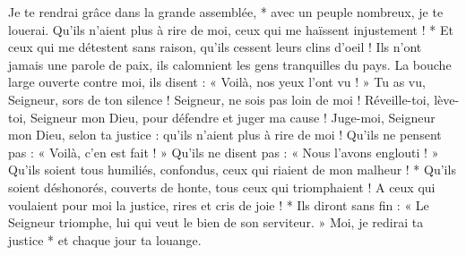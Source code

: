 Je te rendrai grâce dans la grande assemblée, * avec un peuple nombreux, je te louerai.
\versseparator
Qu'ils n'aient plus à rire de moi, ceux qui me haïssent injustement ! * Et ceux qui me détestent sans raison, qu'ils cessent leurs clins d'oeil !
\versseparator
Ils n'ont jamais une parole de paix, ils calomnient les gens tranquilles du pays.
\versseparator
La bouche large ouverte contre moi, ils disent : « Voilà, nos yeux l'ont vu ! »
\versseparator
Tu as vu, Seigneur, sors de ton silence ! Seigneur, ne sois pas loin de moi !
\versseparator
Réveille-toi, lève-toi, Seigneur mon Dieu, pour défendre et juger ma cause !
\versseparator
Juge-moi, Seigneur mon Dieu, selon ta justice : qu'ils n'aient plus à rire de moi !
\versseparator
Qu'ils ne pensent pas : « Voilà, c'en est fait ! » Qu'ils ne disent pas : « Nous l'avons englouti ! »
\versseparator
Qu'ils soient tous humiliés, confondus, ceux qui riaient de mon malheur ! * Qu'ils soient déshonorés, couverts de honte, tous ceux qui triomphaient !
\versseparator
A ceux qui voulaient pour moi la justice, rires et cris de joie ! * Ils diront sans fin : « Le Seigneur triomphe, lui qui veut le bien de son serviteur. »
\versseparator
Moi, je redirai ta justice * et chaque jour ta louange.
